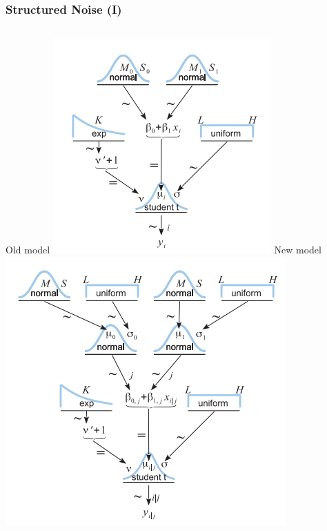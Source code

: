 \documentclass[usenames,dvipsnames,table]{beamer}
\begin{document}
\begin{frame}
\frametitle{Structured Noise (I)}
\begin{columns}
Old model
\includegraphics[width=\textwidth]{img/fig17_2}
New model
\includegraphics[width=\textwidth]{img/fig17_6}
\end{columns}
\end{frame}
\end{document}
